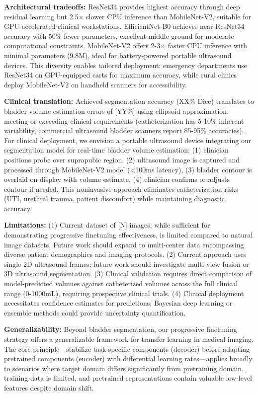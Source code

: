 \documentclass{article}
\begin{document}
\textbf{Architectural tradeoffs:} ResNet34 provides highest accuracy through deep residual learning but 2.5$\times$ slower CPU inference than MobileNet-V2, suitable for GPU-accelerated clinical workstations. EfficientNet-B0 achieves near-ResNet34 accuracy with 50\% fewer parameters, excellent middle ground for moderate computational constraints. MobileNet-V2 offers 2-3$\times$ faster CPU inference with minimal parameters (9.8M), ideal for battery-powered portable ultrasound devices. This diversity enables tailored deployment: emergency departments use ResNet34 on GPU-equipped carts for maximum accuracy, while rural clinics deploy MobileNet-V2 on handheld scanners for accessibility.

\textbf{Clinical translation:} Achieved segmentation accuracy (XX\% Dice) translates to bladder volume estimation errors of [YY\%] using ellipsoid approximation, meeting or exceeding clinical requirements (catheterization has 5-10\% inherent variability, commercial ultrasound bladder scanners report 85-95\% accuracies). For clinical deployment, we envision a portable ultrasound device integrating our segmentation model for real-time bladder volume estimation: (1) clinician positions probe over suprapubic region, (2) ultrasound image is captured and processed through MobileNet-V2 model (<100ms latency), (3) bladder contour is overlaid on display with volume estimate, (4) clinician confirms or adjusts contour if needed. This noninvasive approach eliminates catheterization risks (UTI, urethral trauma, patient discomfort) while maintaining diagnostic accuracy.

\textbf{Limitations:} (1) Current dataset of [N] images, while sufficient for demonstrating progressive finetuning effectiveness, is limited compared to natural image datasets. Future work should expand to multi-center data encompassing diverse patient demographics and imaging protocols. (2) Current approach uses single 2D ultrasound frames; future work should investigate multi-view fusion or 3D ultrasound segmentation. (3) Clinical validation requires direct comparison of model-predicted volumes against catheterized volumes across the full clinical range (0-1000mL), requiring prospective clinical trials. (4) Clinical deployment necessitates confidence estimates for predictions; Bayesian deep learning or ensemble methods could provide uncertainty quantification.

\textbf{Generalizability:} Beyond bladder segmentation, our progressive finetuning strategy offers a generalizable framework for transfer learning in medical imaging. The core principle—stabilize task-specific components (decoder) before adapting pretrained components (encoder) with differential learning rates—applies broadly to scenarios where target domain differs significantly from pretraining domain, training data is limited, and pretrained representations contain valuable low-level features despite domain shift.
\end{document}
